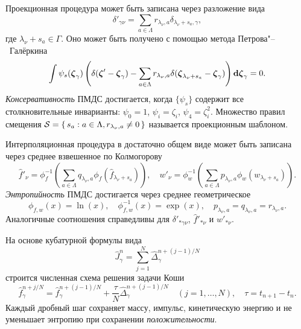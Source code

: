 Проекционная процедура может быть записана через разложение вида
\begin{equation*}
    \delta'_{\gamma\nu} = \sum_{a\in\Lambda} r_{\lambda_\nu,a}\delta_{\lambda_\nu+s_a,\gamma},
\end{equation*}
где \(\lambda_\nu+s_a\in\Gamma\). Оно может быть получено с помощью метода Петрова"--~Галёркина
\begin{equation*}
    \int \psi_s({\boldsymbol{\zeta}}_\gamma) \left(
        \delta({\boldsymbol{\zeta}}'-{\boldsymbol{\zeta}}_\gamma)
        - \sum_{a\in\Lambda} r_{\lambda_\nu,a} \delta({\boldsymbol{\zeta}}_{\lambda_\nu+s_a}-{\boldsymbol{\zeta}}_\gamma)
    \right) \boldsymbol{\mathrm{d}\zeta}_\gamma = 0.
\end{equation*}
\emph{Консервативность} ПМДС достигается, когда \(\{\psi_s\}\) содержит все столкновительные инварианты:
\(\psi_0 = 1\), \(\psi_i = \zeta_i\), \(\psi_4 = \zeta_i^2\).
Множество правил смещения \(\mathcal{S} = \{\,{s_a}:{a\in\Lambda, r_{\lambda_\nu,a}\neq0}\,\}\) называется проекционным шаблоном.

Интерполяционная процедура в достаточно общем виде может быть записана через среднее взвешенное по Колмогорову
\begin{equation*}
    \hat{f}'_{\nu} = \phi^{-1}_f\left(\sum_{a\in\Lambda} q_{\lambda_\nu,a}
        \phi_f\left(\hat{f}_{\lambda_\nu+s_a}\right)\right), \quad
    w'_{\nu} = \phi^{-1}_w\left(\sum_{a\in\Lambda} p_{\lambda_\nu,a}
        \phi_w\left(w_{\lambda_\nu+s_a}\right)\right).
\end{equation*}
\emph{Энтропийность} ПМДС достигается через среднее геометрическое
\begin{equation*}
   \phi_{f,w}(x) = \ln(x), \quad \phi_{f,w}^{-1}(x) = \exp(x), \quad p_{\lambda_\nu,a} = q_{\lambda_\nu,a} = r_{\lambda_\nu,a}.
\end{equation*}
Аналогичные соотношения справедливы для \(\delta'_{*\gamma\nu}\), \(\hat{f}'_{*\nu}\) и \(w'_{*\nu}\).

На основе кубатурной формулы вида
\begin{equation*}
    \hat{J}_\gamma^n = \sum_{j=1}^N \hat{\Delta}_{\gamma}^{n+(j-1)/N}
\end{equation*}
строится численная схема решения задачи Коши
\begin{equation*}
    \hat{f}_\gamma^{n+j/N} = \hat{f}_\gamma^{n+(j-1)/N} + \frac{\tau}{N}\hat{\Delta}_{\gamma}^{n+(j-1)/N}
    \quad (j = 1,\dotsc,N), \quad \tau = t_{n+1}-t_n.
\end{equation*}
Каждый дробный шаг сохраняет массу, импульс, кинетическую энергию и не уменьшает энтропию
при сохранении \emph{положительности}.

